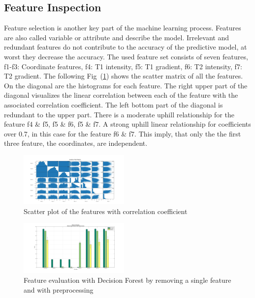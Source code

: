 \documentclass[journal]{IEEEtran}
\begin{document}
\subsection{Feature Inspection}

Feature selection is another key part of the machine learning process. Features are also called variable or attribute and describe the model. Irrelevant and redundant features do not contribute to the accuracy of the predictive model, at worst they decrease the accuracy. The used feature set consists of seven features, f1-f3: Coordinate features, f4: T1 intensity, f5: T1 gradient, f6: T2 intensity, f7: T2 gradient. The following Fig~(\ref{scatterplot}) shows the scatter matrix of all the features. On the diagonal are the histograms for each feature. The right upper part of the diagonal visualizes the linear correlation between each of the feature with the associated correlation coefficient. The left bottom part of the diagonal is redundant to the upper part. There is a moderate uphill relationship for the feature f4 \& f5, f5 \& f6, f5 \& f7. A strong uphill linear relationship for coefficients over 0.7, in this case for the feature f6 \& f7. This imply, that only the the first three feature, the coordinates, are independent.

\begin{figure}
	\centering
	\includegraphics[width=0.48\textwidth]{images/ScatterPlotMatrix}
	\caption{Scatter plot of the features with correlation coefficient}
	\label{scatterplot}
\end{figure}


\begin{figure}
	\centering
	\includegraphics[width=0.48\textwidth]{images/DF_FE_WSF_PP}
	\caption{Feature evaluation with Decision Forest by removing a single feature and with preprocessing}
	\label{DF_FeatEval_WSF_PP}
\end{figure}
\end{document}
